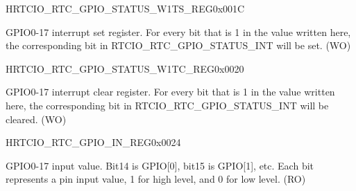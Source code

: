 \begin{register}{H}{RTCIO\_RTC\_GPIO\_STATUS\_W1TS\_REG}{0x001C}\label{regdesc:RTCIORTCGPIOSTATUSW1TSREG}
%
%
\regnewline%
\begin{regdesc}\begin{reglist}
\item [RTCIO\_RTC\_GPIO\_STATUS\_INT\_W1TS]GPIO0-17 interrupt set register. For every bit that is 1 in the value written here, the corresponding bit in RTCIO\_RTC\_GPIO\_STATUS\_INT will be set. (WO)
\end{reglist}\end{regdesc}
\end{register}


\begin{register}{H}{RTCIO\_RTC\_GPIO\_STATUS\_W1TC\_REG}{0x0020}\label{regdesc:RTCIORTCGPIOSTATUSW1TCREG}
%
%
\regnewline%
\begin{regdesc}\begin{reglist}
\item [RTCIO\_RTC\_GPIO\_STATUS\_INT\_W1TC]GPIO0-17 interrupt clear register. For every bit that is 1 in the value written here, the corresponding bit in RTCIO\_RTC\_GPIO\_STATUS\_INT will be cleared. (WO)
\end{reglist}\end{regdesc}
\end{register}


\begin{register}{H}{RTCIO\_RTC\_GPIO\_IN\_REG}{0x0024}\label{regdesc:RTCIORTCGPIOINREG}
%
%
\regnewline%
\begin{regdesc}\begin{reglist}
\item [RTCIO\_RTC\_GPIO\_IN\_NEXT]GPIO0-17 input value. Bit14 is GPIO[0], bit15 is GPIO[1], etc. Each bit represents a pin input value, 1 for high level, and 0 for low level. (RO)
\end{reglist}\end{regdesc}
\end{register}



